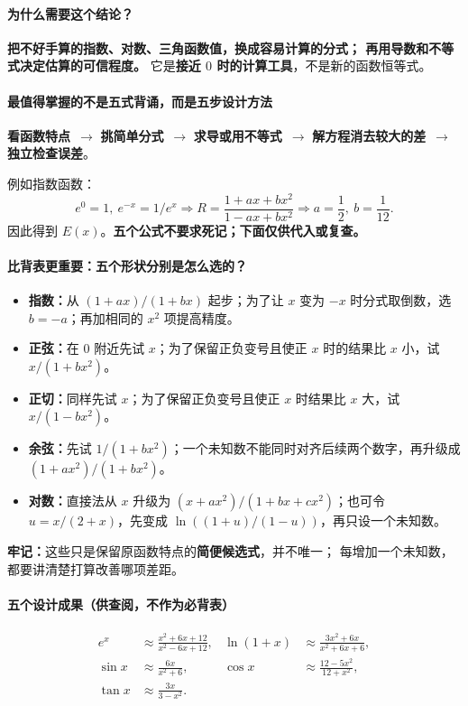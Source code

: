 \clearpage
\begin{summarybox}
\paragraph{为什么需要这个结论？}
\textbf{把不好手算的指数、对数、三角函数值，换成容易计算的分式；
再用导数和不等式决定估算的可信程度。}
它是\textbf{接近 $0$ 时的计算工具}，不是新的函数恒等式。

\paragraph{最值得掌握的不是五式背诵，而是五步设计方法}
\textbf{看函数特点}\ $\longrightarrow$ \textbf{挑简单分式}\ $\longrightarrow$
\textbf{求导或用不等式}\ $\longrightarrow$ \textbf{解方程消去较大的差}\ $\longrightarrow$ \textbf{独立检查误差}。

例如指数函数：
\[
 e^0=1,\ e^{-x}=1/e^x
 \Longrightarrow R=\frac{1+ax+bx^2}{1-ax+bx^2}
 \Longrightarrow a=\frac12,\ b=\frac1{12}.
\]
因此得到 $E(x)$。\textbf{五个公式不要求死记；下面仅供代入或复查。}


\paragraph{比背表更重要：五个形状分别是怎么选的？}
\begin{itemize}
\item \textbf{指数：}从 $(1+ax)/(1+bx)$ 起步；为了让 $x$ 变为 $-x$ 时分式取倒数，选 $b=-a$；再加相同的 $x^2$ 项提高精度。
\item \textbf{正弦：}在 $0$ 附近先试 $x$；为了保留正负变号且使正 $x$ 时的结果比 $x$ 小，试 $x/(1+bx^2)$。
\item \textbf{正切：}同样先试 $x$；为了保留正负变号且使正 $x$ 时结果比 $x$ 大，试 $x/(1-bx^2)$。
\item \textbf{余弦：}先试 $1/(1+bx^2)$；一个未知数不能同时对齐后续两个数字，再升级成 $(1+ax^2)/(1+bx^2)$。
\item \textbf{对数：}直接法从 $x$ 升级为 $(x+ax^2)/(1+bx+cx^2)$；也可令 $u=x/(2+x)$，先变成 $\ln((1+u)/(1-u))$，再只设一个未知数。
\end{itemize}
\textbf{牢记：}这些只是保留原函数特点的\textbf{简便候选式}，并不唯一；
每增加一个未知数，都要讲清楚打算改善哪项差距。

\paragraph{五个设计成果（供查阅，不作为必背表）}
\[
\begin{aligned}
e^x&\approx\frac{x^2+6x+12}{x^2-6x+12},&
\ln(1+x)&\approx\frac{3x^2+6x}{x^2+6x+6},\\
\sin x&\approx\frac{6x}{x^2+6},&
\cos x&\approx\frac{12-5x^2}{12+x^2},\\
\tan x&\approx\frac{3x}{3-x^2}.
\end{aligned}
\]


\end{summarybox}
